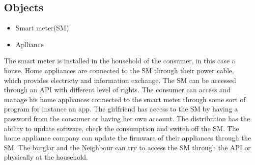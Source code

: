 \subsection{Objects}
\begin{itemize}
\item Smart meter(SM)
\item Aplliance
\end{itemize}

The smart meter is installed in the household of the consumer, in this case a house.
Home appliances are connected to the SM through their power cable, which provides electricty and information exchange.
The SM can be accessed through an API with different level of rights.
The consumer can access and manage his home appliances connected to the smart meter through some sort of program for instance an app.
The girlfriend has access to the SM by having a password from the consumer or having her own account.
The distribution has the ability to update software, check the consumption and switch off the SM.
The home appliance company can update the firmware of their appliances through the SM.
The burglar and the Neighbour can try to access the SM through the API or physically at the household.
